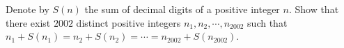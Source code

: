 Denote by $ S(n)$ the sum of decimal digits of a positive integer $ n$. Show that there exist $ 2002$ distinct positive integers $ n_1, n_2, \cdots, n_{2002}$ such that $ n_1 + S(n_1) = n_2 + S(n_2) = \cdots = n_{2002} + S(n_{2002})$.
